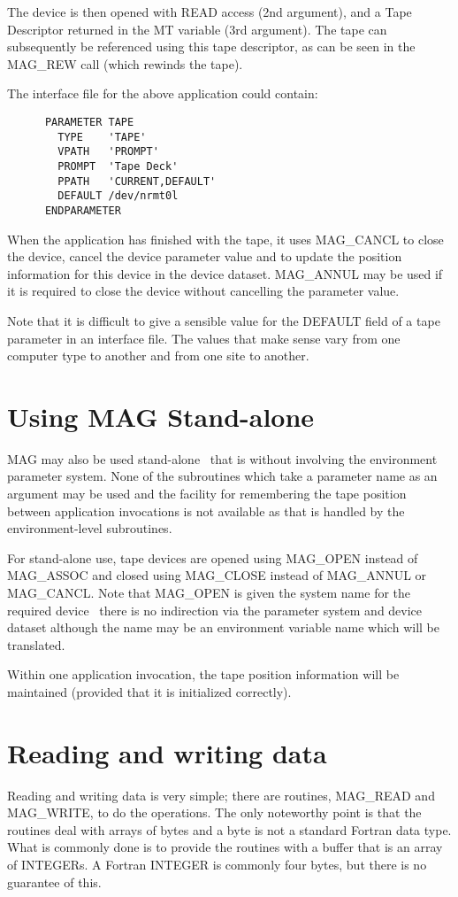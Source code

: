 The device is then opened with READ access (2nd argument), and
a Tape Descriptor returned in the MT variable (3rd argument). The tape
can subsequently be referenced using this tape descriptor, as can be
seen in the MAG\_REW call (which rewinds the tape).

The interface file for the above application could contain:

\small
\begin{verbatim}
      PARAMETER TAPE
        TYPE    'TAPE'
        VPATH   'PROMPT'
        PROMPT  'Tape Deck'
        PPATH   'CURRENT,DEFAULT'
        DEFAULT /dev/nrmt0l
      ENDPARAMETER
\end{verbatim}
\normalsize

When the application has finished with the tape, it uses MAG\_CANCL
to close the device, cancel the device parameter value and
to update the position information for this device in the device dataset.
MAG\_ANNUL may be used if it is required to close the device without
cancelling the parameter value.

Note that it is difficult to give a sensible value for the DEFAULT field of a
tape parameter in an interface file. The values that make sense vary from one
computer type to another and from one site to another.

\section{Using MAG Stand-alone}
MAG may also be used stand-alone \dash\ that is without involving the
environment parameter system.
None of the subroutines which take a parameter name as an
argument may be used and the facility for remembering the tape position between
application invocations is not available as that is handled by the
environment-level subroutines.

For stand-alone use, tape devices are opened using MAG\_OPEN instead
of MAG\_ASSOC and closed using MAG\_CLOSE instead of MAG\_ANNUL or MAG\_CANCL.
Note that MAG\_OPEN is given the system name for the required device
\dash\ there is no indirection via the parameter system and device dataset
although the name may be an environment variable name which will be translated.

Within one application invocation, the tape position information will be
maintained (provided that it is initialized correctly).

\section{Reading and writing data}
Reading and writing data is very simple; there are routines, MAG\_READ
and MAG\_WRITE, to do the operations. The only noteworthy point is that the
routines deal with arrays of bytes and a byte is not a standard Fortran data
type. What is commonly done is to provide the routines with a buffer that is
an array of INTEGERs.
A Fortran INTEGER is commonly four bytes, but there is no guarantee
of this.

